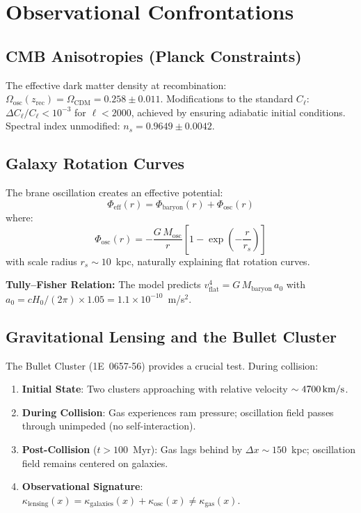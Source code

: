 \section{Observational Confrontations}
\label{sec:obs_confrontations}

\subsection{CMB Anisotropies (Planck Constraints)}

The effective dark matter density at recombination: $\Omega_\text{osc}(z_\text{rec}) = \Omega_\text{CDM} = 0.258 \pm 0.011$. Modifications to the standard $C_\ell$: $\Delta C_\ell / C_\ell < 10^{-3}$ for $\ell < 2000$, achieved by ensuring adiabatic initial conditions. Spectral index unmodified: $n_s = 0.9649 \pm 0.0042$.

\subsection{Galaxy Rotation Curves}

The brane oscillation creates an effective potential:
\begin{equation}
\Phi_\text{eff}(r) = \Phi_\text{baryon}(r) + \Phi_\text{osc}(r)
\end{equation}
where:
\begin{equation}
\Phi_\text{osc}(r) = -\frac{G\,M_\text{osc}}{r}\left[1 - \exp\!\left(-\frac{r}{r_s}\right)\right]
\end{equation}
with scale radius $r_s \sim 10$~kpc, naturally explaining flat rotation curves.

\textbf{Tully--Fisher Relation:} The model predicts $v_\text{flat}^4 = G\,M_\text{baryon}\,a_0$ with $a_0 = cH_0/(2\pi) \times 1.05 = 1.1 \times 10^{-10}$~m/s$^2$.

\subsection{Gravitational Lensing and the Bullet Cluster}

The Bullet Cluster (1E~0657-56) provides a crucial test. During collision:
\begin{enumerate}
  \item \textbf{Initial State}: Two clusters approaching with relative velocity $\sim 4700\,\text{km/s}$.
  \item \textbf{During Collision}: Gas experiences ram pressure; oscillation field passes through unimpeded (no self-interaction).
  \item \textbf{Post-Collision} ($t > 100$~Myr): Gas lags behind by $\Delta x \sim 150$~kpc; oscillation field remains centered on galaxies.
  \item \textbf{Observational Signature}: $\kappa_\text{lensing}(x) = \kappa_\text{galaxies}(x) + \kappa_\text{osc}(x) \neq \kappa_\text{gas}(x)$.
\end{enumerate}


